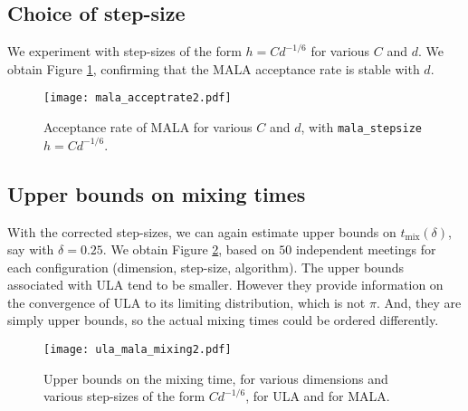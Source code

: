 \documentclass{article}
\begin{document}
\subsection{Choice of step-size}
We experiment with step-sizes of the form $h=C d^{-1/6}$ for various $C$ and $d$.
We obtain Figure \ref{fig:acceptancerate}, confirming that the MALA acceptance
rate is stable with $d$.

\begin{figure}[!ht]
\begin{center}
\texttt{[image: mala\_acceptrate2.pdf]}
\caption{Acceptance rate of MALA for various $C$ and $d$,
  with \texttt{mala\_stepsize} $h=Cd^{-1/6}$. \label{fig:acceptancerate}}
\end{center}
\end{figure}

\subsection{Upper bounds on mixing times}

With the corrected step-sizes, we can again estimate upper bounds on
$t_{\text{mix}}(\delta)$, say with $\delta = 0.25$.  We obtain Figure
\ref{fig:mixing}, based on $50$ independent meetings for each configuration
(dimension, step-size, algorithm). The upper bounds associated with ULA tend to be smaller.
However they provide information on the convergence of ULA to its limiting
distribution, which is not $\pi$. And, they are simply upper bounds, so the
actual mixing times could be ordered differently.

\begin{figure}[!ht]
\begin{center}
\texttt{[image: ula\_mala\_mixing2.pdf]}
\caption{ Upper bounds on the mixing time, for various dimensions
  and various step-sizes of the form $C d^{-1/6}$,
  for ULA and for MALA. \label{fig:mixing}}
\end{center}
\end{figure}




\end{document}
